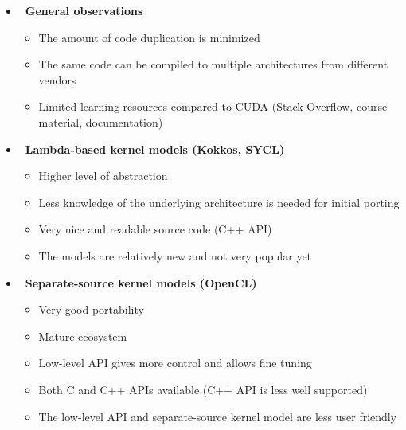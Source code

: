 \begin{itemize}
    \item~\textbf{General observations}
    \begin{itemize}
        \item The amount of code duplication is minimized
        \item The same code can be compiled to multiple architectures from different vendors
        \item Limited learning resources compared to CUDA (Stack Overflow, course material, documentation)
    \end{itemize}
    \item~\textbf{Lambda-based kernel models (Kokkos, SYCL)}
    \begin{itemize}
        \item Higher level of abstraction
        \item Less knowledge of the underlying architecture is needed for initial porting
        \item Very nice and readable source code (C++ API)
        \item The models are relatively new and not very popular yet
    \end{itemize}
    \item~\textbf{Separate-source kernel models (OpenCL)}
    \begin{itemize}
        \item Very good portability
        \item Mature ecosystem
        \item Low-level API gives more control and allows fine tuning
        \item Both C and C++ APIs available (C++ API is less well supported)
        \item The low-level API and separate-source kernel model are less user friendly
    \end{itemize}
\end{itemize}

